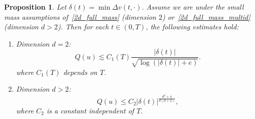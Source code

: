 \documentclass[11pt,a4paper]{article}
\numberwithin{equation}{section}
\theoremstyle{plain}
\newtheorem{proposition}[theorem]{Proposition}
\theoremstyle{remark}
\newcommand {\f}{\frac}
\begin{document}
\begin{proposition}\label{prop:split_cases_fullmass}
Let $\delta(t)= \min\Delta v(t,\cdot)$. Assume we are under the small mass assumptions of~\ref{2d_full_mass} (dimension $2$) or~\ref{2d_full_mass_multid} (dimension $d>2$). Then for each $t\in(0,T)$, the following estimates hold:
\begin{enumerate}
\item Dimension $d=2$:
\[
Q(u) \lesssim C_1(T) \f{|\delta(t)|}{\sqrt{\log(|\delta(t)|+e)}}.
\]
where $C_1(T)$ depends on $T$.   

\item Dimension $d>2$:
\[
Q(u)  \le  
C_{2}|\delta(t)|^{\f{d^2+4}{d(d+2)}},
\]
 where $C_{2}$ is a constant independent of $T$.
\end{enumerate}
\end{proposition}
\end{document}
